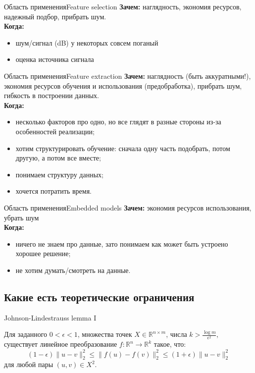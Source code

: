 \documentclass[14pt, fleqn, xcolor={dvipsnames, table}]{beamer}
\begin{document}
\begin{frame}{Область применения}{Feature selection}
\textbf{Зачем:} наглядность, экономия ресурсов, надежный подбор, прибрать шум. \\
\textbf{Когда:}
\begin{itemize}
  \item шум/сигнал (dB) у некоторых совсем поганый
  \item оценка источника сигнала
\end{itemize}
\end{frame}

\begin{frame}{Область применения}{Feature extraction}
\textbf{Зачем:} наглядность (быть аккуратными!), экономия ресурсов обучения и использования (предобработка), прибрать шум, гибкость в построении данных. \\
\textbf{Когда:}
\begin{itemize}
  \item несколько факторов про одно, но все глядят в разные стороны из-за особенностей реализации;
  \item хотим структурировать обучение: сначала одну часть подобрать, потом другую, а потом все вместе;
  \item понимаем структуру данных;
  \item хочется потратить время.
\end{itemize}
\end{frame}

\begin{frame}{Область применения}{Embedded models}
\textbf{Зачем:} экономия ресурсов использования, убрать шум \\
\textbf{Когда:}
\begin{itemize}
  \item ничего не знаем про данные, зато понимаем как может быть устроено хорошее решение;
  \item не хотим думать/смотреть на данные.
\end{itemize}
\end{frame}

\subsection{Какие есть теоретические ограничения}
\begin{frame}{Johnson-Lindestrauss lemma I}
\begin{theorem}{}
Для заданного $0<\epsilon<1$, множества точек $X \in \mathbb{R}^{n\times m}$, числа $k > \frac{\log m}{\epsilon^2}$, существует линейное преобразование $f: \mathbb{R}^n \to \mathbb{R}^k$ такое, что:
$$
(1 - \epsilon) \|u - v\|_2^2 \le \|f(u) - f(v)\|_2^2 \le (1 + \epsilon) \|u - v\|_2^2
$$
для любой пары $(u,v) \in X^2$.
\end{theorem}
\end{frame}
\end{document}
